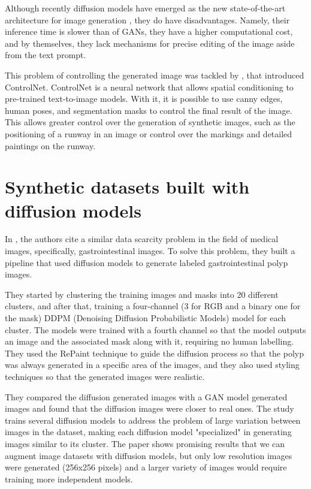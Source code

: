 Although recently diffusion models have emerged as the new state-of-the-art architecture for image generation \cite{yang_diffusion_2024}, they do have disadvantages. Namely, their inference time is slower than of GANs, they have a higher computational cost, and by themselves, they lack mechanisms for precise editing of the image aside from the text prompt.

This problem of controlling the generated image was tackled by \cite{zhang_adding_2023}, that introduced ControlNet. ControlNet is a neural network that allows spatial conditioning to pre-trained text-to-image models. With it, it is possible to use canny edges, human poses, and segmentation masks to control the final result of the image. This allows greater control over the generation of synthetic images, such as the positioning of a runway in an image or control over the markings and detailed paintings on the runway.

\section{Synthetic datasets built with diffusion models}

In \cite{saragih_using_2024}, the authors cite a similar data scarcity problem in the field of medical images, specifically, gastrointestinal images. To solve this problem, they built a pipeline that used diffusion models to generate labeled gastrointestinal polyp images.

They started by clustering the training images and masks into 20 different clusters, and after that, training a four-channel (3 for RGB and a binary one for the mask) DDPM (Denoising Diffusion Probabilistic Models) model for each cluster. The models were trained with a fourth channel so that the model outputs an image and the associated mask along with it, requiring no human labelling. They used the RePaint \cite{lugmayr_repaint_2022} technique to guide the diffusion process so that the polyp was always generated in a specific area of the images, and they also used styling techniques so that the generated images were realistic. 

They compared the diffusion generated images with a GAN model generated images and found that the diffusion images were closer to real ones. The study trains several diffusion models to address the problem of large variation between images in the dataset, making each diffusion model "specialized" in generating images similar to its cluster. The paper shows promising results that we can augment image datasets with diffusion models, but only low resolution images were generated (256x256 pixels) and a larger variety of images would require training more independent models.

